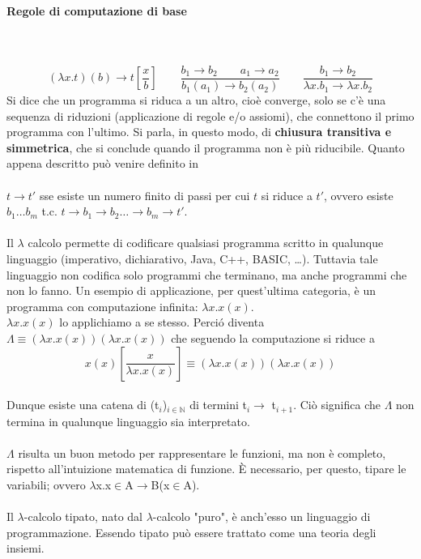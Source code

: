 \paragraph{Regole di computazione di base}\mbox{}\\\\ 
\[ (\lambda x.t)(b) \rightarrow t[\frac{x}{b}] \qquad
\frac{b_1 \rightarrow b_2	\qquad a_1 \rightarrow a_2 }{b_1(a_1) \rightarrow b_2(a_2)} \qquad 
\frac{b_1 \rightarrow b_2}{\lambda x.b_1 \rightarrow \lambda x.b_2} \]
\noindent
Si dice che un programma si riduca a un altro, cio\`e converge, solo se c'\`e una sequenza di riduzioni (applicazione di regole e/o assiomi), che connettono il primo programma con l'ultimo. Si parla, in questo modo, di \textbf{chiusura transitiva e simmetrica}, che si conclude quando il programma non \`e pi\`u riducibile. Quanto appena descritto pu\`o venire definito in\\\\ $t \rightarrow t'$ sse esiste un numero finito di passi per cui $t$ si riduce a $t'$, ovvero esiste $b_1 \dots b_m$ t.c. $t \rightarrow b_1 \rightarrow b_2 \dots \rightarrow b_m \rightarrow t'$.\\\\
Il $\lambda$ calcolo permette di codificare qualsiasi programma scritto in qualunque linguaggio (imperativo, dichiarativo, Java, C++, BASIC, \dots). Tuttavia tale linguaggio non codifica solo programmi che terminano, ma anche programmi che non lo fanno.
Un esempio di applicazione, per quest'ultima categoria, \`e un programma con computazione infinita: $\lambda x.x(x)$.\\
$\lambda x.x(x)$ lo applichiamo a se stesso. Perci\'o diventa $\Lambda \equiv (\lambda x.x(x))(\lambda x.x(x))$
che seguendo la computazione si riduce a \[x(x)[\frac{x}{\lambda x.x(x)}] \equiv (\lambda x.x(x))(\lambda x.x(x))\]\\
Dunque esiste una catena di (t$_i$)$_{i\in\mathbb{N}}$ di termini t$_i \rightarrow$ t$_{i+1}$. Ci\`o significa che
$\Lambda$ non termina in qualunque linguaggio sia interpretato.\\\\
$\Lambda$ risulta un buon metodo per rappresentare le funzioni, ma non \`e completo, rispetto all'intuizione matematica di funzione. \`E necessario, per questo, tipare le variabili; ovvero $\lambda$x.x$\in$A$\rightarrow$B(x$\in$A).\\\\
Il $\lambda$-calcolo tipato, nato dal $\lambda$-calcolo "puro", \`e anch'esso un linguaggio di programmazione. Essendo tipato pu\`o essere trattato come una teoria degli insiemi.

